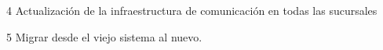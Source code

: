 \begin{proyecto}
{4}
{Actualización de la infraestructura de comunicación en todas las sucursales}
{}

  \begin{etapas}
    \etapa {}
  \end{etapas}

  \begin{recursos}
    \recurso {}
  \end{recursos}

  \tiempo {}
\end{proyecto}


\begin{proyecto}
{5}
{Migrar desde el viejo sistema al nuevo.}
{}

  \begin{etapas}
    \etapa {}
  \end{etapas}

  \begin{recursos}
    \recurso {}
  \end{recursos}

  \tiempo {}
\end{proyecto}

